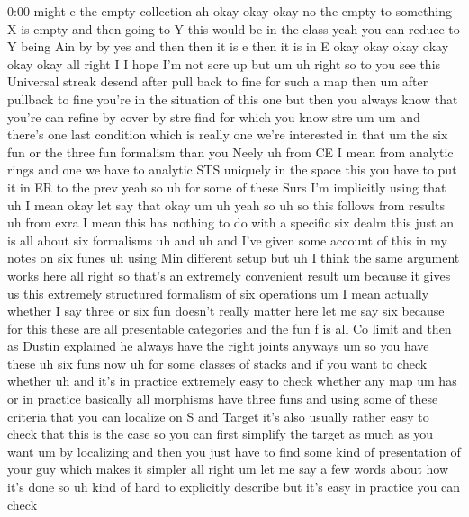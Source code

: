 \begin{unfinished}{0:00}
might  e  the  empty
collection  ah  okay  okay
okay  no  the  empty  to  something  X  is
empty  and  then  going  to  Y  this  would  be
in  the  class  yeah  you  can  reduce  to  Y
being  Ain  by  by  yes  and  then  then  it  is
e  then  it  is  in  E  okay  okay  okay  okay
okay
okay  all  right  I  I  hope  I'm  not  scre  up
but
um  uh  right  so  to  you  see  this  Universal
streak  desend  after  pull  back  to  fine
for  such  a  map  then  um  after  pullback  to
fine  you're  in  the  situation  of  this  one
but  then  you  always  know  that  you're  can
refine  by  cover  by  stre  find  for  which
you  know
stre
um
um  and  there's  one  last  condition  which
is  really  one  we're  interested  in  that
um  the  six  fun  or  the  three  fun
formalism  than  you
Neely
uh  from
CE  I  mean  from  analytic  rings  and  one  we
have  to  analytic
STS  uniquely  in
the  space
this  you  have  to  put  it  in  ER  to  the
prev  yeah  so  uh  for  some  of  these  Surs
I'm  implicitly  using  that  uh  I  mean  okay
let  say  that
okay
um
uh  yeah  so  uh  so  this  follows  from
results
uh  from  exra  I  mean  this  has  nothing  to
do  with  a  specific  six  dealm  this  just
an  is  all  about  six
formalisms
uh
and  uh
and  I've  given  some  account  of  this  in
my  notes  on  six
funes  uh  using  Min  different  setup  but
uh  I  think  the  same  argument  works
here
all  right  so  that's  an  extremely
convenient  result
um  because  it  gives  us  this  extremely
structured  formalism  of  six  operations
um  I  mean  actually  whether  I  say  three
or  six  fun  doesn't  really  matter
here  let  me  say  six  because  for  this
these  are  all  presentable  categories  and
the  fun  f  is  all  Co  limit  and  then  as
Dustin  explained  he  always  have  the
right  joints  anyways  um  so  you  have
these  uh  six  funs
now  uh  for  some  classes  of  stacks  and  if
you  want  to  check  whether  uh  and  it's  in
practice  extremely  easy  to  check  whether
any  map
um  has  or  in  practice  basically  all
morphisms  have  three  funs  and  using  some
of  these  criteria  that  you  can  localize
on  S  and  Target  it's  also  usually  rather
easy  to  check  that  this  is  the
case  so  you  can  first  simplify  the
target  as  much  as  you  want  um  by
localizing  and  then  you  just  have  to
find  some  kind  of  presentation  of  your
guy  which  makes  it  simpler
all  right  um  let  me  say  a  few  words
about  how  it's  done  so
uh  kind  of  hard  to  explicitly  describe
but  it's  easy  in  practice  you  can  check

\end{unfinished}
